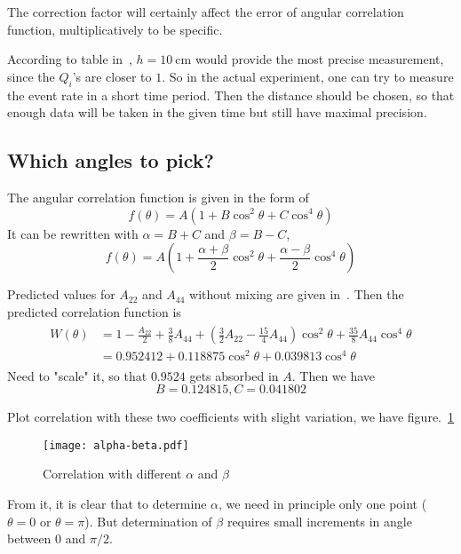 The correction factor will certainly affect the error of angular correlation function, multiplicatively to be specific.

According to table in~\cite{siegbahn}, $h=\SI{10}{\cm}$ would provide the most precise measurement, since the $Q_i$'s are closer to $1$. So in the actual experiment, one can try to measure the event rate in a short time period. Then the distance should be chosen, so that enough data will be taken in the given time but still have maximal precision.

\subsection{Which angles to pick?}
The angular correlation function is given in the form of~\cite{descr}
\begin{equation}
   f(\theta) = A(1 + B \cos^2\theta + C \cos^4 \theta)
   \label{math:fTheta}
\end{equation}
It can be rewritten with $\alpha= B + C$ and $\beta = B-C$,
\begin{equation}
   f(\theta) = A \left( 1 + \frac{\alpha + \beta}{ 2} \cos^2\theta + \frac{\alpha-\beta}{2} \cos^4 \theta \right)
\end{equation}

Predicted values for $A_{22}$ and $A_{44}$ without mixing are given in~\cite{siegbahn}. Then the predicted correlation function is
\begin{align}
   \begin{split}
   W(\theta) &= 1 - \frac{A_{22}}{2} + \frac{3}{8} A_{44} + \left( \frac{3}{2} A_{22} - \frac{15}{4} A_{44} \right) \cos^2 \theta + \frac{35}{8} A_{44} \cos^4 \theta \\
   &= 0.952412 + 0.118875 \cos^2 \theta + 0.039813 \cos^4 \theta
   \end{split}\label{math:pred}
\end{align}
Need to "scale" it, so that $0.9524$ gets absorbed in $A$. Then we have
\begin{equation*}
   B=0.124815, C=0.041802
\end{equation*}

Plot correlation with these two coefficients with slight variation, we have figure.~\ref{fig:alpha-beta}
\begin{figure}[ht]
   \centering
   \texttt{[image: alpha-beta.pdf]}
   \caption{Correlation with different $\alpha$ and $\beta$}%
   \label{fig:alpha-beta}
\end{figure}
From it, it is clear that to determine $\alpha$, we need in principle only one point ($\theta=0$ or $\theta=\pi$). But determination of $\beta$  requires small increments in angle between $0$ and $\pi/2$.

